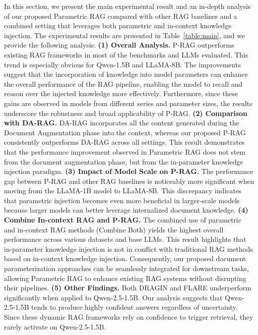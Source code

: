 \documentclass[sigconf,natbib=true,anonymous=false]{acmart}
\begin{document}
In this section, we present the main experimental result and an in-depth analysis of our proposed Parametric RAG compared with other RAG baselines and a combined setting that leverages both parametric and in-context knowledge injection. 
The experimental results are presented in Table~\ref{table:main}, and we provide the following analysis:
\textbf{(1) Overall Analysis.} 
P-RAG outperforms existing RAG frameworks in most of the benchmarks and LLMs evaluated. This trend is especially obvious for Qwen-1.5B and LLaMA-8B. The improvements suggest that the incorporation of knowledge into model parameters can enhance the overall performance of the RAG pipeline, enabling the model to recall and reason over the injected knowledge more effectively. Furthermore, since these gains are observed in models from different series and parameter sizes, the results underscore the robustness and broad applicability of P-RAG.
\textbf{(2) Comparison with DA-RAG.}
DA-RAG incorporates all the content generated during the Document Augmentation phase into the context, whereas our proposed P-RAG consistently outperforms DA-RAG across all settings. This result demonstrates that the performance improvement observed in Parametric RAG does not stem from the document augmentation phase, but from the in-parameter knowledge injection paradigm.
\textbf{(3) Impact of Model Scale on P-RAG.} 
The performance gap between P-RAG and other RAG baselines is noticeably more significant when moving from the LLaMA-1B model to LLaMA-8B. This discrepancy indicates that parametric injection becomes even more beneficial in larger-scale models because larger models can better leverage internalized document knowledge. 
\textbf{(4) Combine In-context RAG and P-RAG.} 
The combined use of parametric and in-context RAG methods (Combine Both) yields the highest overall performance across various datasets and base LLMs. 
This result highlights that in-parameter knowledge injection is not in conflict with traditional RAG methods based on in-context knowledge injection.
Consequently, our proposed document parameterization approaches can be seamlessly integrated for downstream tasks, allowing Parametric RAG to enhance existing RAG systems without disrupting their pipelines.
\textbf{(5) Other Findings.}
Both DRAGIN and FLARE underperform significantly when applied to Qwen-2.5-1.5B. Our analysis suggests that Qwen-2.5-1.5B tends to produce highly confident answers regardless of uncertainty. Since these dynamic RAG frameworks rely on confidence to trigger retrieval, they rarely activate on Qwen-2.5-1.5B. 
\end{document}
